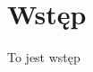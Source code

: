 \documentclass[document.tex]{subfiles}
\begin{document}
\chapter{Wstęp}
To jest wstęp
\end{document}
